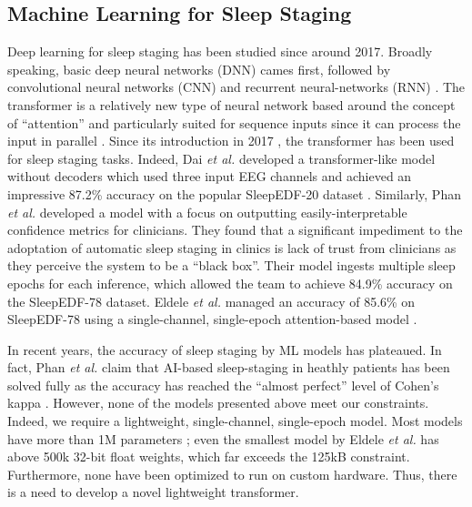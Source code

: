 \subsection{Machine Learning for Sleep Staging}
Deep learning for sleep staging has been studied since around 2017. Broadly speaking, basic deep neural networks (DNN) cames first, followed by convolutional neural networks (CNN) and recurrent neural-networks (RNN) \cite{phan2022sleeptransformer}.
The transformer is a relatively new type of neural network based around the concept of ``attention'' and particularly suited for sequence inputs since it can process the input in parallel \cite{han2022survey}. Since its introduction in 2017 \cite{vaswani2017attention}, 
the transformer has been used for sleep staging tasks. Indeed, Dai \textit{et al.} developed a transformer-like model without decoders which used three input EEG channels and achieved an impressive 87.2\% accuracy on the popular SleepEDF-20 dataset
\cite{dai2023multichannelsleepnet}. Similarly, Phan \textit{et al.} developed a model with a focus on outputting easily-interpretable confidence metrics for clinicians. They found that a significant impediment to the adoptation of automatic sleep staging in clinics
is lack of trust from clinicians as they perceive the system to be a ``black box''. Their model ingests multiple sleep epochs for each inference, which allowed the team to achieve 84.9\% accuracy on the SleepEDF-78 dataset. Eldele \textit{et al.} managed an
accuracy of 85.6\% on SleepEDF-78 using a single-channel, single-epoch attention-based model \cite{eldele2021attention}.

In recent years, the accuracy of sleep staging by ML models has plateaued. In fact, Phan \textit{et al.} claim that AI-based sleep-staging in heathly patients has been solved fully as the accuracy has reached the ``almost perfect'' level of Cohen's kappa
\cite{phan2022automatic}. However, none of the models presented above meet our constraints. Indeed, we require a lightweight, single-channel, single-epoch model. Most models have more than 1M parameters \cite{phan2022sleeptransformer}; even the smallest
model by Eldele \textit{et al.} has above 500k 32-bit float weights, which far exceeds the 125kB constraint. Furthermore, none have been optimized to run on custom hardware. Thus, there is a need to develop a novel lightweight transformer.

